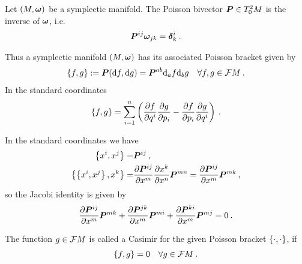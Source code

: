 \begin{definition}
    Let $(M,\boldsymbol{\omega})$ be a symplectic manifold.
    The Poisson bivector $\boldsymbol{P} \in T^2_0 M$ is the inverse of $\boldsymbol{\omega}$, i.e.
    \begin{align}
        \boldsymbol{P}^{ij} \boldsymbol{\omega}_{jk} = \boldsymbol{\delta}^i_k \:.
    \end{align}
\end{definition}
Thus a symplectic manifold $(M,\boldsymbol{\omega})$ has its associated Poisson bracket given by
\begin{align}
    \left \lbrace f,g \right \rbrace := \boldsymbol{P} (\mathrm{d} f, \mathrm{d} g) = \boldsymbol{P}^{ab} \mathrm{d}_a f \mathrm{d}_b g \quad \forall f,g \in \mathcal{F} M \:. 
\end{align}
In the standard coordinates
\begin{align}
    \left \lbrace f,g \right \rbrace = \sum_{i=1}^n \left( \frac{\partial f}{\partial q^i} \frac{\partial g}{\partial p_i} - \frac{\partial f}{\partial p_i} \frac{\partial g}{\partial q^i} \right) \:.
\end{align}

In the standard coordinates we have
\begin{align}
    \left \lbrace x^i,x^j \right \rbrace =& \boldsymbol{P}^{ij} \:, \\
    \left \lbrace \left \lbrace x^i,x^j \right \rbrace,x^k \right \rbrace =& \frac{\partial \boldsymbol{P}^{ij}}{\partial x^m} \frac{\partial x^k}{\partial x^n} \boldsymbol{P}^{mn} = \frac{\partial \boldsymbol{P}^{ij}}{\partial x^m} \boldsymbol{P}^{m k} \:,
\end{align}
so the Jacobi identity is given by
\begin{align}
    \frac{\partial \boldsymbol{P}^{ij}}{\partial x^m} \boldsymbol{P}^{m k} + \frac{\partial \boldsymbol{P}^{jk}}{\partial x^m} \boldsymbol{P}^{m i} + \frac{\partial \boldsymbol{P}^{ki}}{\partial x^m} \boldsymbol{P}^{m j} = 0 \:.
\end{align}

\begin{definition}
    The function $g \in \mathcal{F} M$ is called a Casimir for the given Poisson bracket $\left \lbrace \cdot,\cdot \right \rbrace$, if
    \begin{align}
        \left \lbrace f,g \right \rbrace = 0 \quad \forall g \in \mathcal{F} M \:.
    \end{align}
\end{definition}